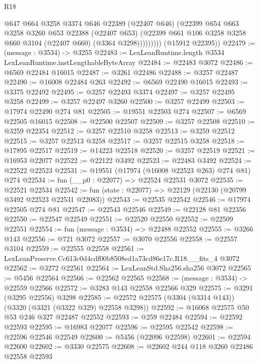\begin{lexlean}{R18}
\begin{coremodule}
                  @647
                  @664
                  @3258
                  @3374
                  @646
                  @22389
                  (@22407 @646)
                  (@22399
                    @654
                    @663
                    @3258
                    @3260
                    @653
                    @22388
                    (@22407 @653)
                    (@22399 @661 @106 @3258 @3258 @660 @3104 (@22407 @660) (@3364 @3298)))))))))
      (@15912 @22395))
@22479 := (message : @3534) -> @3255
@22483 := LexLeanRuntime.length @3534 LexLeanRuntime.instLengthableByteArray
@22484 := @22483 @3072
@22486 := @6569 @22484 @16015
@22487 := @3261 @22486
@22488 := @3257 @22487
@22490 := @16008 @22484 @263
@22492 := @6569 @22490 @16015
@22493 := @3375 @22492
@22495 := @3257 @22493 @3374
@22497 := @3257 @22495 @3258
@22499 := @3257 @22497 @3260
@22500 := @3257 @22499
@22503 := @17974 @22490 @274 @81
@22505 := @19551 @22503 @274
@22507 := @6569 @22505 @16015
@22508 := @22500 @22507
@22509 := @3257 @22508
@22510 := @3259 @22354
@22512 := @3257 @22510 @3258
@22513 := @3259 @22512
@22515 := @3257 @22513 @3258
@22517 := @3257 @22515 @3258
@22518 := @17895 @22517
@22519 := @14223 @22518
@22520 := @3257 @22519
@22521 := @16953 @22077
@22522 := @22122 @3492
@22523 := @22483 @3492
@22524 := @22522 @22523
@22531 := @19551 (@17974 (@16008 @22523 @263) @274 @81) @274
@22534 := fun (__p0 : @22077) => @22524 @22531 @3072
@22535 := @22521 @22534
@22542 := fun (state : @22077) => @22129 (@22130 (@20799 @3492 @22523 @22531 @22083))
@22543 := @22535 @22542
@22546 := @17974 @22505 @274 @81
@22547 := @22543 @22546
@22549 := @22128 @81 @22356
@22550 := @22547 @22549
@22551 := @22520 @22550
@22552 := @22509 @22551
@22554 := fun (message : @3534) => @22488 @22552
@22555 := @3266 @143
@22556 := @721 @3072
@22557 := @3070 @22556
@22558 := @22557 @3104
@22559 := @22555 @22558
@22561 := LexLeanPreserve.Cc613c0d4cdf00b8508ed1a73cd86e17c.R18.__fits_4 @3072
@22562 := @3272 @22561
@22564 := LexLeanStd.Sha256.sha256 @3072
@22565 := @5456 @22564
@22566 := @22562 @22565
@22568 := (message : @3534) -> @22559 @22566
@22572 := @3283 @143 @22558 @22566 @329
@22575 := @3291 (@3295 @22556) @3298
@22585 := @22572 @22575 (@3304 (@3314 @143)) (@3320 (@3321 (@3322 @329) @22558 @3298))
@22592 := @16068 @22575 @50 @53 @246 @327 @22487 @22552
@22593 := @259 @22484
@22594 := @22592 @22593
@22595 := @16983 @22077
@22596 := @22595 @22542
@22598 := @22596 @22546 @22549
@22600 := @5456 (@22096 @22598)
@22601 := @22594 @22600
@22602 := @3330 @22575
@22608 := @22602 @244 @118 @3260 @22486 @22558 @22593

\end{coremodule}
\end{lexlean}
